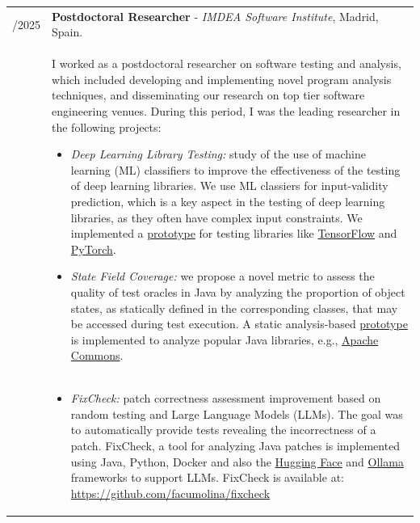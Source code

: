 \documentclass[a4paper,10pt]{article} %
\begin{document}
\begin{longtable}{>{\raggedleft\arraybackslash}p{} p{}}
2022/2025 & \textbf{Postdoctoral Researcher} - \textit{IMDEA Software Institute}, Madrid, Spain. \\
& I worked as a postdoctoral researcher on software testing and analysis, which included developing and implementing novel program analysis techniques, and disseminating our research on top tier software engineering venues. During this period, I was the leading researcher in the following projects: 
\begin{itemize}
\setlength\itemsep{0.1em}
\item \textit{Deep Learning Library Testing:} study of the use of machine learning (ML) classifiers to improve the effectiveness of the testing of deep learning libraries. We use ML classiers for input-validity prediction, which is a key aspect in the testing of deep learning libraries, as they often have complex input constraints. We implemented a \href{https://sites.google.com/view/ml4dllconstraints}{prototype} for testing libraries like \href{https://www.tensorflow.org/}{TensorFlow} and \href{https://pytorch.org/}{PyTorch}. 
\item \textit{State Field Coverage:} we propose a novel metric to assess the quality of test oracles in Java by analyzing the proportion of object states, as statically defined in the corresponding classes, that may be accessed during test execution. A static analysis-based \href{https://zenodo.org/records/17255287}{prototype} is implemented to analyze popular Java libraries, e.g., \href{https://commons.apache.org/}{Apache Commons}. 
\end{itemize} \\
&
\begin{itemize}
\setlength\itemsep{0.1em}
\item \textit{FixCheck:} patch correctness assessment improvement based on random testing and Large Language Models (LLMs). The goal was to automatically provide tests revealing the incorrectness of a patch. FixCheck, a tool for analyzing Java patches is implemented using Java, Python, Docker and also the \href{https://huggingface.co/}{Hugging Face} and \href{https://ollama.com/}{Ollama} frameworks to support LLMs. FixCheck is available at: \href{https://github.com/facumolina/fixcheck}{https://github.com/facumolina/fixcheck}
\end{itemize} \\ 


\end{longtable}
\end{document}
